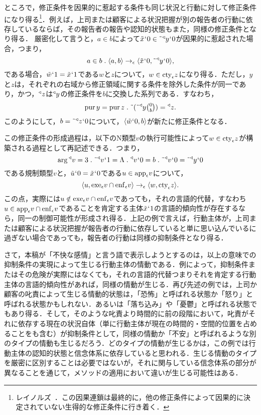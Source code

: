 ところで，修正条件を因果的に惹起する条件も同じ状況と行動に対して修正条件になり得る\footnote{レイノルズ~\cite[p.\,12]{レイノルズ}．この因果連鎖は最終的に，他の修正条件によって因果的に決定されていない生得的な修正条件に行き着く．}．例えば，上司または顧客による状況把握が別の報告者の行動に依存しているならば，その報告者の報告や認知的状態もまた，同様の修正条件となり得る．
厳密化して言うと，$ a\in b $によって$ \tilde{x}{\mspace{1mu}{`}\mspace{1mu}} 0\in\tilde{\:\:}{^\triangleleft}y{\mspace{1mu}{`}\mspace{1mu}} 0 $が因果的に惹起された場合，つまり，
\[
    a\in b\con{1}\orp{a,b}\to_{\epsilon}\orp{\tilde{x}\fap0,\tildel{\trgl{y}}\fap 0},
\]
である場合，$ \tilde{w}{\mspace{1mu}{`}\mspace{1mu}} 1 = \tilde{x}{\mspace{1mu}{`}\mspace{1mu}} 1 $である$w$と$z$について，$w\in\mathrm{cty}_{\epsilon}z$になり得る．ただし，$y$と$z$は，それぞれの右域から修正領域に関する条件を除外した条件が同一であり，かつ，$ {^\triangleleft}z $は$ {^\triangleleft}y $の修正条件を$b$に交換した系列である．すなわち，
\[
    \mathrm{pur}\,y = \mathrm{pur}\,z\con{1}\tildel{(\tildel{\trgl{y}}\tbinom{0}{b})} = \trgl{z}.
\]
このようにして，$ b = \tilde{\:\:}{^\triangleleft}z{\mspace{1mu}{`}\mspace{1mu}} 0 $について，$ \langle \tilde{w}{\mspace{1mu}{`}\mspace{1mu}} 0,b \rangle $が新たに修正条件となる．

この修正条件の形成過程は，以下のN類型$v$の執行可能性によって$ w\in \mathrm{cty}_{\epsilon}z $が構築される過程として再記述できる．つまり，
\[
    \arg\trgl{v} = 3\con{1}\tildel{\trgl{v}}\fap 1 = \Lambda\con{1}\trgl{v}\fap 0 = b\con{1}
    \tildel{\trgl{v}}\fap 0 = \tildel{\trgl{y}}\fap 0
\]
である規制類型$v$と，$ \tilde{u}{\mspace{1mu}{`}\mspace{1mu}} 0 = \tilde{x}{\mspace{1mu}{`}\mspace{1mu}} 0 $である$ u\in\mathrm{app}_{\epsilon}v $について，
\[
   \langle u,\mathrm{exe}_{\epsilon}v\cap\mathrm{enf}_{\epsilon}v \rangle\to_{\epsilon}\langle w,\mathrm{cty}_{\epsilon}z \rangle.
\]
この点，実際には$ u\notin \mathrm{exe}_{\epsilon}v\cap\mathrm{enf}_{\epsilon}v $であっても，それの言語的代替，すなわち$ u\in \mathrm{app}_{\epsilon}v\cap\mathrm{enf}_{\epsilon}v $であることを肯定する主体$ \tilde{x}{\mspace{1mu}{`}\mspace{1mu}} 1 $の言語的傾向性が存在するなら，同一の制御可能性が形成され得る．上記の例で言えば，行動主体が，上司または顧客による状況把握が報告者の行動に依存していると単に思い込んでいるに過ぎない場合であっても，報告者の行動は同様の抑制条件となり得る．

さて，本稿が「不快な感情」と言う語で表示しようとするのは，以上の意味での抑制条件の実現によって生じる行動主体の情動である．例によって，抑制条件またはその危険が実際にはなくても，それの言語的代替つまりそれを肯定する行動主体の言語的傾向性があれば，同様の情動が生じる．再び先述の例では，上司か顧客の叱責によって生じる情動的状態は，「恐怖」と呼ばれる状態か「怒り」と呼ばれる状態かもしれない．あるいは「落ち込み」や「憂鬱」と呼ばれる状態でもあり得る．そして，そのような叱責より時間的に前の段階において，叱責がそれに依存する現在の状況自体（単に行動主体が現在の時間的・空間的位置を占めることをも含む）が抑制条件として，同様の情動か「不安」と呼ばれるような別のタイプの情動も生じるだろう．どのタイプの情動が生じるかは，この例では行動主体の認知的状態と信念体系に依存していると思われる．生じる情動のタイプを厳密に区別することは必要ではないが，それに関与している信念体系の部分が異なることを通じて，メソッドの適用において違いが生じる可能性はある．

